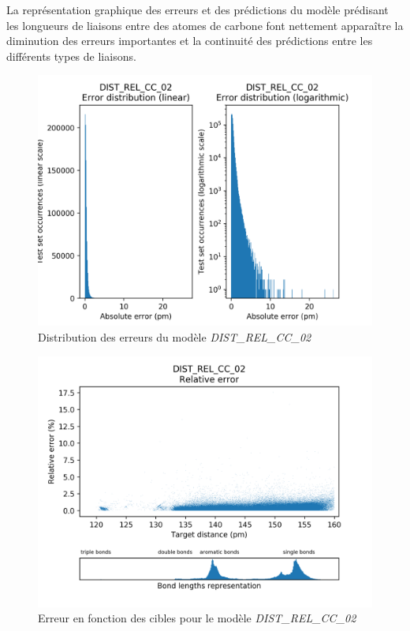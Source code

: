 \par La représentation graphique des erreurs et des prédictions du modèle prédisant les longueurs de liaisons entre des atomes de carbone font nettement apparaître la diminution des erreurs importantes et la continuité des prédictions entre les différents types de liaisons.


\begin{figure}[!h]
	\centering
	
	\includegraphics[scale=0.8]{../figures/DIST_REL_CC_02/DIST_REL_CC_02_distrib_rmse_val.png}	
	
	\caption{Distribution des erreurs du modèle \emph{DIST\_REL\_CC\_02}}
\end{figure}
\begin{figure}[!h]
	\centering
	
	\includegraphics[scale=0.8]{../figures/DIST_REL_CC_02/DIST_REL_CC_02_distrib_rmse_dist.png}	
	
	\caption{Erreur en fonction des cibles pour le modèle \emph{DIST\_REL\_CC\_02}}
	\end{figure}

